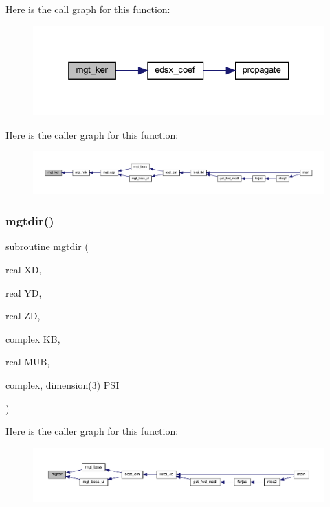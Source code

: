 Here is the call graph for this function\+:\nopagebreak
\begin{figure}[H]
\begin{center}
\leavevmode
\includegraphics[width=325pt]{Leroi_8f90_ad35190cbd2113592b83c9f1e721b8d07_cgraph}
\end{center}
\end{figure}
Here is the caller graph for this function\+:\nopagebreak
\begin{figure}[H]
\begin{center}
\leavevmode
\includegraphics[width=350pt]{Leroi_8f90_ad35190cbd2113592b83c9f1e721b8d07_icgraph}
\end{center}
\end{figure}
\mbox{\label{Leroi_8f90_a96acb0ecb10b6c9a318ee0aa7cc60bdc}} 
\subsubsection{\texorpdfstring{mgtdir()}{mgtdir()}}
{\footnotesize\ttfamily subroutine mgtdir (\begin{DoxyParamCaption}\item[{real}]{XD,  }\item[{real}]{YD,  }\item[{real}]{ZD,  }\item[{complex}]{KB,  }\item[{real}]{M\+UB,  }\item[{complex, dimension(3)}]{P\+SI }\end{DoxyParamCaption})}

Here is the caller graph for this function\+:\nopagebreak
\begin{figure}[H]
\begin{center}
\leavevmode
\includegraphics[width=350pt]{Leroi_8f90_a96acb0ecb10b6c9a318ee0aa7cc60bdc_icgraph}
\end{center}
\end{figure}
\mbox{\label{Leroi_8f90_a8f13594331f001917eefb525bce81f61}} 
